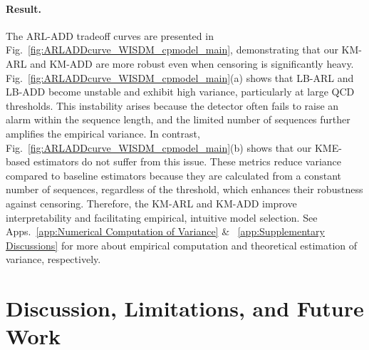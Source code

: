 \documentclass{article}
\theoremstyle{plain}
\theoremstyle{definition}
\theoremstyle{remark}
\begin{document}
\paragraph{Result.}
The ARL-ADD tradeoff curves are presented in Fig.~\ref{fig:ARLADDcurve_WISDM_cpmodel_main}, demonstrating that our KM-ARL and KM-ADD are more robust even when censoring is significantly heavy.
Fig.~\ref{fig:ARLADDcurve_WISDM_cpmodel_main}(a) shows that LB-ARL and LB-ADD become unstable and exhibit high variance, particularly at large QCD thresholds. This instability arises because the detector often fails to raise an alarm within the sequence length, and the limited number of sequences further amplifies the empirical variance.
In contrast, Fig.~\ref{fig:ARLADDcurve_WISDM_cpmodel_main}(b) shows that our KME-based estimators do not suffer from this issue. 
These metrics reduce variance compared to baseline estimators because they are calculated from a constant number of sequences, regardless of the threshold, which enhances their robustness against censoring.
Therefore, the KM-ARL and KM-ADD improve interpretability and facilitating empirical, intuitive model selection.
See Apps.~\ref{app:Numerical Computation of Variance} \& ~\ref{app:Supplementary Discussions} for more about empirical computation and theoretical estimation of variance, respectively.





















\section{Discussion, Limitations, and Future Work} \label{sec:Discussion and Limitations}
\end{document}
